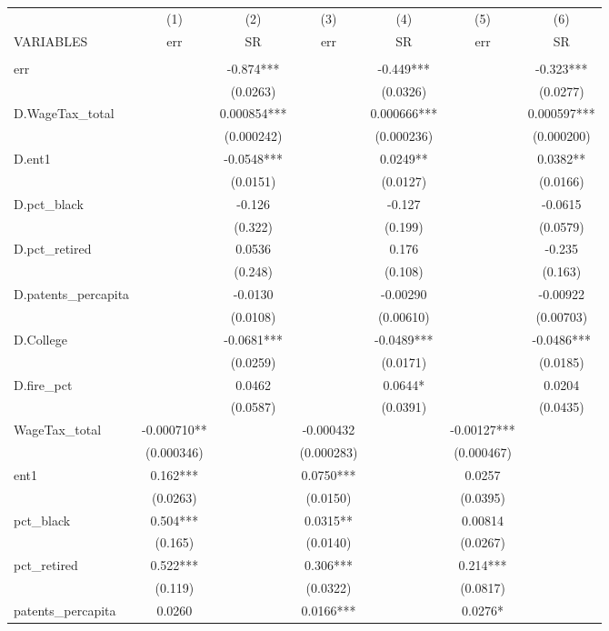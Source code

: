 \begin{tabular}{lcccccc} \hline
 & (1) & (2) & (3) & (4) & (5) & (6) \\
VARIABLES & err & SR & err & SR & err & SR \\ \hline
 &  &  &  &  &  &  \\
err &  & -0.874*** &  & -0.449*** &  & -0.323*** \\
 &  & (0.0263) &  & (0.0326) &  & (0.0277) \\
D.WageTax\_total &  & 0.000854*** &  & 0.000666*** &  & 0.000597*** \\
 &  & (0.000242) &  & (0.000236) &  & (0.000200) \\
D.ent1 &  & -0.0548*** &  & 0.0249** &  & 0.0382** \\
 &  & (0.0151) &  & (0.0127) &  & (0.0166) \\
D.pct\_black &  & -0.126 &  & -0.127 &  & -0.0615 \\
 &  & (0.322) &  & (0.199) &  & (0.0579) \\
D.pct\_retired &  & 0.0536 &  & 0.176 &  & -0.235 \\
 &  & (0.248) &  & (0.108) &  & (0.163) \\
D.patents\_percapita &  & -0.0130 &  & -0.00290 &  & -0.00922 \\
 &  & (0.0108) &  & (0.00610) &  & (0.00703) \\
D.College &  & -0.0681*** &  & -0.0489*** &  & -0.0486*** \\
 &  & (0.0259) &  & (0.0171) &  & (0.0185) \\
D.fire\_pct &  & 0.0462 &  & 0.0644* &  & 0.0204 \\
 &  & (0.0587) &  & (0.0391) &  & (0.0435) \\
WageTax\_total & -0.000710** &  & -0.000432 &  & -0.00127*** &  \\
 & (0.000346) &  & (0.000283) &  & (0.000467) &  \\
ent1 & 0.162*** &  & 0.0750*** &  & 0.0257 &  \\
 & (0.0263) &  & (0.0150) &  & (0.0395) &  \\
pct\_black & 0.504*** &  & 0.0315** &  & 0.00814 &  \\
 & (0.165) &  & (0.0140) &  & (0.0267) &  \\
pct\_retired & 0.522*** &  & 0.306*** &  & 0.214*** &  \\
 & (0.119) &  & (0.0322) &  & (0.0817) &  \\
patents\_percapita & 0.0260 &  & 0.0166*** &  & 0.0276* &  \\

\end{tabular}
